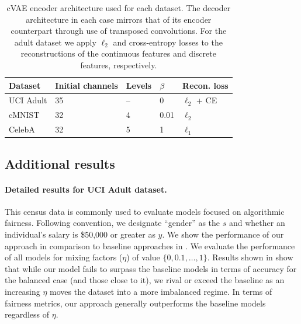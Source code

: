 \begin{table}[tp]
\caption{
    \ac{cVAE} encoder architecture used for each dataset. The decoder architecture in each case mirrors that
of its encoder counterpart through use of transposed convolutions. For the adult dataset we apply
$\ell_2$ and cross-entropy losses to the reconstructions of the continuous features and discrete
features, respectively. }
\label{tab:vae_architectures}
\centering
\begin{tabular}{lllll}
\toprule
Dataset   & Initial channels & Levels & $\beta$ & Recon. loss \\
\midrule
UCI Adult & 35               & --     & 0       & $\ell_2$ + CE\\
cMNIST    & 32               & 4      & 0.01    & $\ell_2$ \\
CelebA    & 32               & 5      & 1       & $\ell_1$ \\ 
\bottomrule
\end{tabular}
\end{table}
%
\subsection{Additional results}\label{sec:additional-results}
%
\paragraph{Detailed results for UCI Adult dataset.}
%
This census data is commonly used to evaluate models focused on algorithmic fairness. 
%
Following convention, we designate ``gender'' as the $s$ and whether an individual's salary is
\$50,000 or greater as $y$. 
%
We show the performance of our approach in comparison to baseline approaches in
. 
%
We evaluate the performance of all models for mixing factors ($\eta$) of value \( \{0, 0.1, \dots,
1\} \). 
%
Results shown in  show that while our model fails to surpass the
baseline models in terms of accuracy for the balanced case (and those close to it), we rival or
exceed the baseline as an increasing \(\eta\) moves the dataset into a more imbalanced regime. 
%
In terms of fairness metrics,  our approach generally outperforms the baseline models regardless of
$\eta$.


